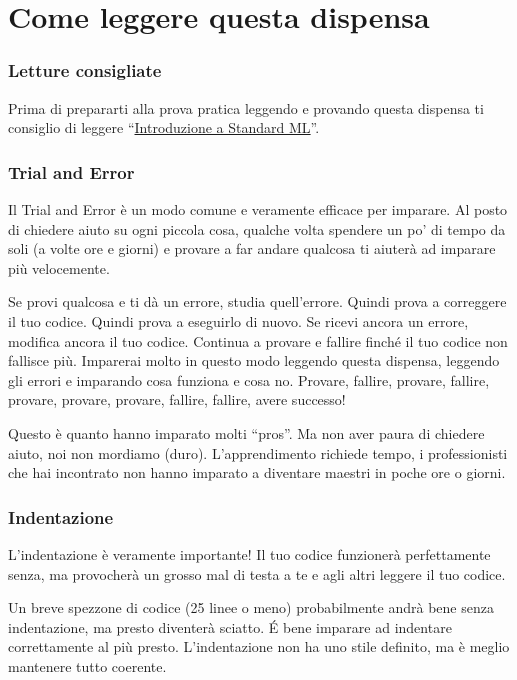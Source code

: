 \section*{Come leggere questa dispensa}

\subsubsection{Letture consigliate}

Prima di prepararti alla prova pratica leggendo e provando questa dispensa ti consiglio di leggere ``\href{run:./intro-sml.pdf}{Introduzione a Standard ML}''.

\subsubsection*{Trial and Error}

Il Trial and Error è un modo comune e veramente efficace per imparare.
Al posto di chiedere aiuto su ogni piccola cosa, qualche volta spendere un po' di tempo da soli (a volte ore e giorni) e provare a far andare qualcosa ti aiuterà ad imparare più velocemente.

Se provi qualcosa e ti dà un errore, studia quell'errore.
Quindi prova a correggere il tuo codice.
Quindi prova a eseguirlo di nuovo. Se ricevi ancora un errore, modifica ancora il tuo codice.
Continua a provare e fallire finché il tuo codice non fallisce più.
Imparerai molto in questo modo leggendo questa dispensa, leggendo gli errori e imparando cosa funziona e cosa no. Provare, fallire, provare, fallire, provare, provare, provare, fallire, fallire, avere successo!

Questo è quanto hanno imparato molti ``pros''.
Ma non aver paura di chiedere aiuto, noi non mordiamo (duro).
L'apprendimento richiede tempo, i professionisti che hai incontrato non hanno imparato a diventare maestri in poche ore o giorni.

\subsubsection*{Indentazione}

L'indentazione è veramente importante! Il tuo codice funzionerà perfettamente senza, ma provocherà un grosso mal di testa a te e agli altri leggere il tuo codice.

Un breve spezzone di codice (25 linee o meno) probabilmente andrà bene senza indentazione, ma presto diventerà sciatto. \'E bene imparare ad indentare correttamente al più presto.
L'indentazione non ha uno stile definito, ma è meglio mantenere tutto coerente.

